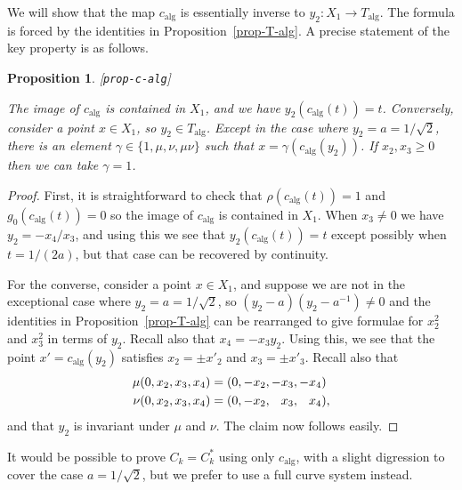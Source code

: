 \documentclass[reqno]{amsart}
\newcommand{\lbl}[1]{\label{#1}\textup{[\texttt{#1}]}\par}
\newcommand{\lbl}{\label}
\newcommand{\alg}	{\operatorname{alg}}
\newcommand{\gm}        {\gamma}
\newcommand{\rt}        {\sqrt{2}}
\newcommand{\pp}        {\hphantom{+}}
\renewcommand{\:}{\colon}
\newtheorem{proposition}[theorem]{Proposition}
\theoremstyle{definition}
\begin{document}
We will show that the map $c_{\alg}$ is essentially inverse to
$y_2\:X_1\to T_{\alg}$.  The formula is forced by the identities in
Proposition~\ref{prop-T-alg}.  A precise statement of the key property
is as follows.

\begin{proposition}\lbl{prop-c-alg}
 The image of $c_{\alg}$ is contained in $X_1$, and we have
 $y_2(c_{\alg}(t))=t$.  Conversely, consider a point $x\in X_1$, so
 $y_2\in T_{\alg}$.  Except in the case where $y_2=a=1/\rt$,
 there is an element $\gm\in\{1,\mu,\nu,\mu\nu\}$ such that
 $x=\gm(c_{\alg}(y_2))$.  If $x_2,x_3\geq 0$ then we can take $\gm=1$.
\end{proposition}
\begin{proof}
 First, it is straightforward to check that $\rho(c_{\alg}(t))=1$ and
 $g_0(c_{\alg}(t))=0$ so the image of $c_{\alg}$ is contained in
 $X_1$.  When $x_3\neq 0$ we have $y_2=-x_4/x_3$, and using this we
 see that $y_2(c_{\alg}(t))=t$ except possibly when $t=1/(2a)$, but
 that case can be recovered by continuity.

 For the converse, consider a point $x\in X_1$, and suppose we are not
 in the exceptional case where $y_2=a=1/\rt$, so
 $(y_2-a)(y_2-a^{-1})\neq 0$ and the identities
 in Proposition~\ref{prop-T-alg} can be rearranged to give formulae
 for $x_2^2$ and $x_3^2$ in terms of $y_2$.  Recall also
 that $x_4=-x_3y_2$.  Using this, we see that the point
 $x'=c_{\alg}(y_2)$ satisfies $x_2=\pm x'_2$ and $x_3=\pm x'_3$.
 Recall also that
 \begin{align*}
  \mu(0,x_2,x_3,x_4) &= (0,   -x_2,   -x_3,   -x_4) \\
  \nu(0,x_2,x_3,x_4) &= (0,   -x_2,\pp x_3,\pp x_4),
 \end{align*}
 and that $y_2$ is invariant under $\mu$ and $\nu$.  The claim now
 follows easily.
\end{proof}

It would be possible to prove $C_k=C_k^*$ using only $c_{\alg}$, with
a slight digression to cover the case $a=1/\rt$, but we prefer to
use a full curve system instead.
\end{document}
